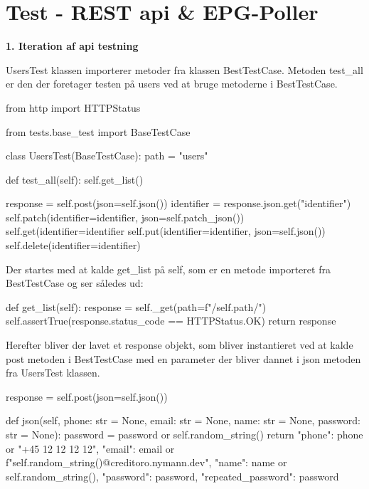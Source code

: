 \section{Test - REST api \& EPG-Poller}\label{api_epg_test}

{\large\textbf{1. Iteration af api testning}}

UsersTest klassen importerer metoder fra klassen BestTestCase. Metoden test\_all er den der foretager testen på users ved at bruge metoderne i BestTestCase.\\

\begin{code}[language=python, caption=UsersTest.py, firstnumber=1]
from http import HTTPStatus

from tests.base_test import BaseTestCase

class UsersTest(BaseTestCase):
    path = "users"

    def test_all(self):
        self.get_list()

        response = self.post(json=self.json())
        identifier = response.json.get("identifier")
        self.patch(identifier=identifier, json=self.patch_json())
        self.get(identifier=identifier
        self.put(identifier=identifier, json=self.json())
        self.delete(identifier=identifier)
\end{code}

Der startes med at kalde get\_list på self, som er en metode importeret fra BestTestCase og ser således ud:\\

\begin{code}[language=python, caption=BestTestCase.py, firstnumber=55]
def get_list(self):
    response = self._get(path=f"/{self.path}/")
    self.assertTrue(response.status_code == HTTPStatus.OK)
    return response
\end{code}

Herefter bliver der lavet et response objekt, som bliver instantieret ved at kalde post metoden i BestTestCase med en parameter der bliver dannet i json metoden fra UsersTest klassen. \\

\begin{code}[language=python, caption=UsersTest.py, firstnumber=12]
response = self.post(json=self.json())
\end{code}

\begin{code}[language=python, caption=UsersTest.py, firstnumber=19]
def json(self, phone: str = None, email: str = None, name: str = None, password: str = None):
    password = password or self.random_string()
    return {
        "phone": phone or "+45 12 12 12 12",
        "email": email or f"{self.random_string()}@creditoro.nymann.dev",
        "name": name or self.random_string(),
        "password": password,
        "repeated_password": password
    }
\end{code}

